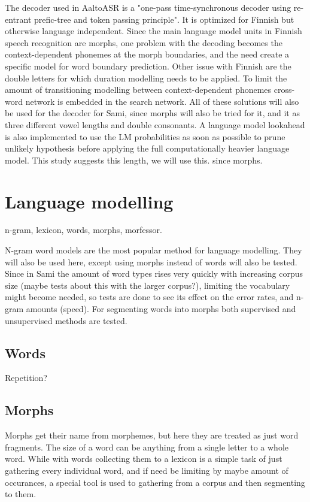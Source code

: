 \documentclass[10pt,b5paper]{article}
\begin{document}
The decoder used in AaltoASR is a "one-pass time-synchronous decoder using re-entrant prefic-tree and token passing principle". It is optimized for Finnish but otherwise language independent. Since the main language model units in Finnish speech recognition are morphs, one problem with the decoding becomes the context-dependent phonemes at the morph boundaries, and the need create a specific model for word boundary prediction. Other issue with Finnish are the double letters for which duration modelling needs to be applied. To limit the amount of transitioning modelling between context-dependent phonemes cross-word network is embedded in the search network. \cite{pylkkonen2013towards}\cite{hirsimaki2009importance}\cite{hirsimaki2006unlimited} All of these solutions will also be used for the decoder for Sami, since morphs will also be tried for it, and it as three different vowel lengths and double consonants. A language model lookahead is also implemented to use the LM probabilities as soon as possible to prune unlikely hypothesis before applying the full computationally heavier language model. This study suggests this length, we will use this. since morphs.

\section{Language modelling}

n-gram, lexicon, words, morphs, morfessor. 

N-gram word models are the most popular method for language modelling. They will also be used here, except using morphs instead of words will also be tested. Since in Sami the amount of word types rises very quickly with increasing corpus size (maybe tests about this with the larger corpus?), limiting the vocabulary might become needed, so tests are done to see its effect on the error rates, and n-gram amounts (speed). For segmenting words into morphs both supervised and unsupervised methods are tested.

\subsection{Words}

Repetition?

\subsection{Morphs}

Morphs get their name from morphemes, but here they are treated as just word fragments. The size of a word can be anything from a single letter to a whole word. While with words collecting them to a lexicon is a simple task of just gathering every individual word, and if need be limiting by maybe amount of occurances, a special tool is used to gathering from a corpus and then segmenting to them.
\end{document}
